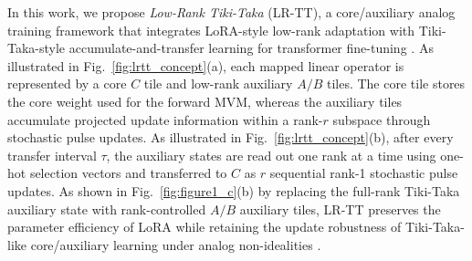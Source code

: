 \documentclass[AMA,LATO2COL]{WileyNJDv5}
\begin{document}
\noindent
In this work, we propose \emph{Low-Rank Tiki-Taka} (LR-TT), a core/auxiliary analog training framework that integrates LoRA-style low-rank adaptation with Tiki-Taka-style accumulate-and-transfer learning for transformer fine-tuning \cite{hu2021lora,gokmen2020tikitaka,gokmen2021ttv2}.
As illustrated in Fig.~\ref{fig:lrtt_concept}(a), each mapped linear operator is represented by a core \(C\) tile and low-rank auxiliary \(A/B\) tiles.
The core tile stores the core weight used for the forward MVM, whereas the auxiliary tiles accumulate projected update information within a rank-\(r\) subspace through stochastic pulse updates.
As illustrated in Fig.~\ref{fig:lrtt_concept}(b), after every transfer interval \(\tau\), the auxiliary states are read out one rank at a time using one-hot selection vectors and transferred to \(C\) as \(r\) sequential rank-1 stochastic pulse updates.
As shown in Fig.~\ref{fig:figure1_c}(b) by replacing the full-rank Tiki-Taka auxiliary state with rank-controlled \(A/B\) auxiliary tiles, LR-TT preserves the parameter efficiency of LoRA while retaining the update robustness of Tiki-Taka-like core/auxiliary learning under analog non-idealities \cite{gokmen2020tikitaka,gokmen2021ttv2,noh2024retention_zeroshifting,rasch2024fastrobust}.
\end{document}

